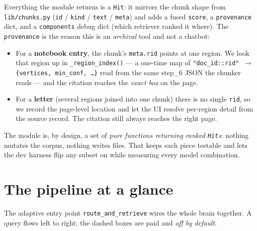 \documentclass[11pt]{article}
\newcommand{\code}[1]{\texttt{#1}}
\newcommand{\file}[1]{\texttt{#1}}
\begin{document}
Everything the module returns is a \code{Hit}: it mirrors the chunk shape from \file{lib/chunks.py}
(\code{id} / \code{kind} / \code{text} / \code{meta}) and adds a fused \code{score}, a
\code{provenance} dict, and a \code{components} debug dict (which retriever ranked it where). The
\code{provenance} is the reason this is an \emph{archival} tool and not a chatbot:

\begin{itemize}[leftmargin=*]
  \item For a \textbf{notebook entry}, the chunk's \code{meta.rid} points at one region. We look that
        region up in \code{\_region\_index()} --- a one-time map of
        \code{"doc\_id::rid" $\to$ \{vertices, min\_conf, \dots\}} read from the same step\_6 JSON
        the chunker reads --- and the citation reaches the \emph{exact box} on the page.
  \item For a \textbf{letter} (several regions joined into one chunk) there is no single \code{rid},
        so we record the page-level location and let the UI resolve per-region detail from the
        source record. The citation still always reaches the right page.
\end{itemize}

\noindent The module is, by design, a set of \emph{pure functions returning ranked \code{Hit}s}:
nothing mutates the corpus, nothing writes files. That keeps each piece testable and lets the dev
harness flip any subset on while measuring every model combination.

\section{The pipeline at a glance}

The adaptive entry point \code{route\_and\_retrieve} wires the whole brain together. A query flows
left to right; the dashed boxes are paid and \emph{off by default}.
\end{document}
